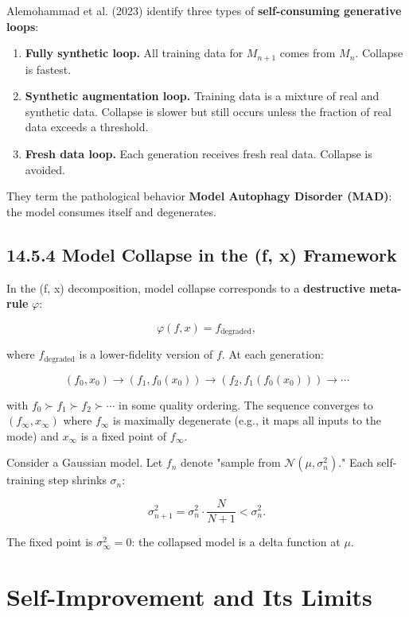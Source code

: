 Alemohammad et al. (2023) identify three types of \textbf{self-consuming generative loops}:

\begin{enumerate}
\item \textbf{Fully synthetic loop.} All training data for $M_{n+1}$ comes from $M_n$. Collapse is fastest.
\item \textbf{Synthetic augmentation loop.} Training data is a mixture of real and synthetic data. Collapse is slower but still occurs unless the fraction of real data exceeds a threshold.
\item \textbf{Fresh data loop.} Each generation receives fresh real data. Collapse is avoided.
\end{enumerate}

They term the pathological behavior \textbf{Model Autophagy Disorder (MAD)}: the model consumes itself and degenerates.

\subsection{14.5.4 Model Collapse in the (f, x) Framework}

In the (f, x) decomposition, model collapse corresponds to a \textbf{destructive meta-rule} $\varphi$:

\[\varphi(f, x) = f_{\text{degraded}},\]

where $f_{\text{degraded}}$ is a lower-fidelity version of $f$. At each generation:

\[(f_0, x_0) \to (f_1, f_0(x_0)) \to (f_2, f_1(f_0(x_0))) \to \cdots\]

with $f_0 \succ f_1 \succ f_2 \succ \cdots$ in some quality ordering. The sequence converges to $(f_\infty, x_\infty)$ where $f_\infty$ is maximally degenerate (e.g., it maps all inputs to the mode) and $x_\infty$ is a fixed point of $f_\infty$.

\begin{example}
Consider a Gaussian model. Let $f_n$ denote "sample from $\mathcal{N}(\mu, \sigma_n^2)$." Each self-training step shrinks $\sigma_n$:

\[\sigma_{n+1}^2 = \sigma_n^2 \cdot \frac{N}{N + 1} < \sigma_n^2.\]

The fixed point is $\sigma_\infty^2 = 0$: the collapsed model is a delta function at $\mu$.
\end{example}



\section{Self-Improvement and Its Limits}

